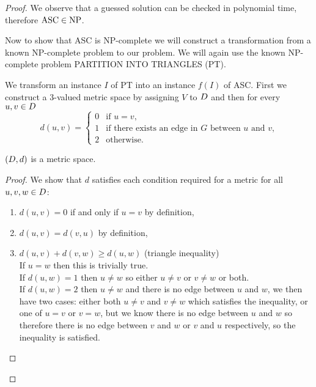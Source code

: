 \begin{proof}
  We observe that a guessed solution can be checked in polynomial time,
  therefore $\text{ASC} \in \text{NP}$.

  Now to show that ASC is NP-complete we will construct a transformation from
  a known NP-complete problem to our problem.  We will again use the known
  NP-complete problem PARTITION INTO TRIANGLES (PT).

  We transform an instance $I$ of PT into an instance $f(I)$ of ASC.  First we
  construct a 3-valued metric space by assigning $V$ to $D$ and then for
  every $u,v \in D$
  \begin{equation*}
    d(u,v) = \begin{cases}
      0 & \text{if $u=v$,}\\
      1 & \text{if there exists an edge in $G$ between $u$ and $v$,}\\
      2 & \text{otherwise.}
    \end{cases}
  \end{equation*}

  \begin{lem}
    \label{lem:3-val-met}
    $(D,d)$ is a metric space.
  \end{lem}
  
  \begin{proof}
    We show that $d$ satisfies each condition required for a metric for all
    $u,v,w \in D$:
    \begin{enumerate}
    \item $d(u,v)=0$ if and only if $u=v$ by definition,
    \item $d(u,v)=d(v,u)$ by definition,
    \item $d(u,v)+d(v,w) \geq d(u,w)$ (triangle inequality)\\
      If $u=w$ then this is trivially true.\\
      If $d(u,w)=1$ then $u \neq w$ so either $u \neq v$ or $v \neq w$ or
      both.\\
      If $d(u,w)=2$ then $u \neq w$ and there is no edge between $u$ and $w$,
      we then have two cases: either both $u \neq v$ and $v \neq w$ which
      satisfies the inequality, or one of $u=v$ or $v=w$, but we know there is
      no edge between $u$ and $w$ so therefore there is no edge between $v$
      and $w$ or $v$ and $u$ respectively, so the inequality is satisfied.
    \end{enumerate}
  \end{proof}


\end{proof}

